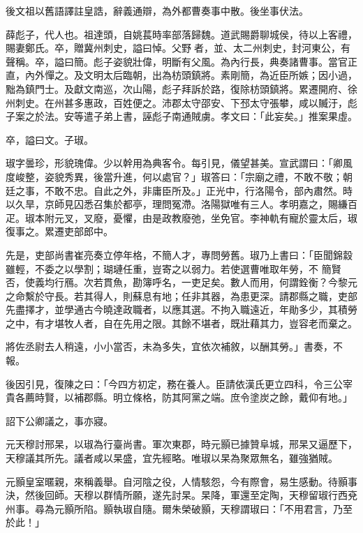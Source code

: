 \begin{pinyinscope}
 後文祖以舊語譯註皇誥，辭義通辯，為外都曹奏事中散。後坐事伏法。



 薛彪子，代人也。祖達頭，自姚萇時率部落歸魏。道武賜爵聊城侯，待以上客禮，賜妻鄭氏。卒，贈冀州刺史，謚曰悼。父野者，並、太二州刺史，封河東公，有聲稱。卒，謚曰簡。彪子姿貌壯偉，明斷有父風。為內行長，典奏諸曹事。當官正直，內外憚之。及文明太后臨朝，出為枋頭鎮將。素剛簡，為近臣所嫉；因小過，黜為鎮門士。及獻文南巡，次山陽，彪子拜訴於路，復除枋頭鎮將。累遷開府、徐州刺史。在州甚多惠政，百姓便之。沛郡太守邵安、下邳太守張攀，咸以贓汙，彪子案之於法。安等遣子弟上書，誣彪子南通賊虜。孝文曰：「此妄矣。」推案果虛。



 卒，謚曰文。子琡。



 琡字曇珍，形貌瑰偉。少以幹用為典客令。每引見，儀望甚美。宣武謂曰：「卿風度峻整，姿貌秀異，後當升進，何以處官？」琡答曰：「宗廟之禮，不敢不敬；朝廷之事，不敢不忠。自此之外，非庸臣所及。」正光中，行洛陽令，部內肅然。時以久旱，京師見囚悉召集於都亭，理問冤滯。洛陽獄唯有三人。孝明嘉之，賜縑百疋。琡本附元叉，叉廢，憂懼，由是政教廢弛，坐免官。李神軌有寵於靈太后，琡復事之。累遷吏部郎中。



 先是，吏部尚書崔亮奏立停年格，不簡人才，專問勞舊。琡乃上書曰：「臣聞錦縠雖輕，不委之以學割；瑚璉任重，豈寄之以弱力。若使選曹唯取年勞，不
 簡賢否，使義均行鴈。次若貫魚，勘簿呼名，一吏足矣。數人而用，何謂銓衡？今黎元之命繫於守長。若其得人，則蘇息有地；任非其器，為患更深。請郡縣之職，吏部先盡擇才，並學通古今曉達政職者，以應其選。不拘入職遠近，年勛多少，其積勞之中，有才堪牧人者，自在先用之限。其餘不堪者，既壯藉其力，豈容老而棄之。



 將佐丞尉去人稍遠，小小當否，未為多失，宜依次補敘，以酬其勞。」書奏，不報。



 後因引見，復陳之曰：「今四方初定，務在養人。臣請依漢氏更立四科，令三公宰貴各薦時賢，以補郡縣。明立條格，防其阿黨之端。庶令塗炭之餘，戴仰有地。」



 詔下公卿議之，事亦寢。



 元天穆討邢杲，以琡為行臺尚書。軍次東郡，時元顥已據贊阜城，邢杲又逼歷下，天穆議其所先。議者咸以杲盛，宜先經略。唯琡以杲為聚眾無名，雖強猶賊。



 元顥皇室暱親，來稱義舉。自河陰之役，人情駭怨，今有際會，易生感動。待顥事決，然後回師。天穆以群情所願，遂先討杲。杲降，軍還至定陶，天穆留琡行西兗州事。尋為元顥所陷。顥執琡自隨。爾朱榮破顥，天穆謂琡曰：「不用君言，乃至於此！」




\end{pinyinscope}
